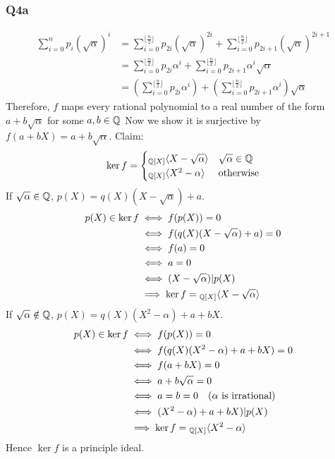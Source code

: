 \subsubsection{Q4a}
\begin{align*}
	\sum_{i = 0}^{n}{p_{i}(\sqrt{\alpha})^i}
	 & = \sum_{i = 0}^{\lfloor \frac{n}{2} \rfloor}{p_{2i}(\sqrt{\alpha})^{2i}}
	+ \sum_{i = 0}^{\lfloor \frac{n}{2} \rfloor}{p_{2i+1}(\sqrt{\alpha})^{2i+1}} \\
	 & = \sum_{i = 0}^{\lfloor \frac{n}{2} \rfloor}{p_{2i}\alpha^i}
	+ \sum_{i = 0}^{\lfloor \frac{n}{2} \rfloor}{p_{2i+1}\alpha^i\sqrt{\alpha}}  \\
	 & = \left(\sum_{i = 0}^{\lfloor \frac{n}{2} \rfloor}{p_{2i}\alpha^i}\right)
	+ \left(\sum_{i = 0}^{\lfloor \frac{n}{2} \rfloor}{p_{2i+1}\alpha^i}\right)\sqrt{\alpha}
\end{align*}
Therefore, $f$ maps every rational polynomial to a real number of the form $a+b\sqrt{\alpha}$ for some $a,b\in\mathbb{Q}$
Now we show it is surjective by \(f(a+bX) = a + b\sqrt{\alpha}\).
\newline
Claim:
\begin{equation*}
	\ker{f} =
	\begin{cases}
		{}_{\mathbb{Q}[X]}\langle X - \sqrt{\alpha} \rangle & \sqrt{\alpha} \in \mathbb{Q} \\
		{}_{\mathbb{Q}[X]}\langle X^2 - \alpha \rangle      & \text{otherwise}
	\end{cases}
\end{equation*}
If \(\sqrt{\alpha} \in \mathbb{Q}\), \(p(X) = q(X) (X - \sqrt{\alpha}) + a\).
\begin{align*}
	p(X) \in \ker{f}
	 & \iff f(p(X)) = 0                                               \\
	 & \iff f(q(X) (X - \sqrt{\alpha}) + a) = 0                       \\
	 & \iff f(a) = 0                                                  \\
	 & \iff a = 0                                                     \\
	 & \iff (X - \sqrt{\alpha}) | p(X)                                \\
	 & \implies \ker{f} = {}_{\mathbb{Q}[X]}\langle X - \sqrt{\alpha} \rangle
\end{align*}
If \(\sqrt{\alpha} \notin \mathbb{Q}\), \(p(X) = q(X) (X^2 - \alpha) + a + bX\).
\begin{align*}
	p(X) \in \ker{f}
	 & \iff f(p(X)) = 0                                          \\
	 & \iff f(q(X) (X^2 - \alpha) + a + bX) = 0                  \\
	 & \iff f(a + bX) = 0                                        \\
	 & \iff a + b \sqrt{\alpha} = 0                              \\
	 & \iff a = b = 0 \quad\text{($\alpha$ is irrational)}       \\
	 & \iff (X^2 - \alpha) + a + bX) | p(X)                      \\
	 & \implies \ker{f} = {}_{\mathbb{Q}[X]}\langle X^2 - \alpha \rangle
\end{align*}
Hence \(\ker{f}\) is a principle ideal.
